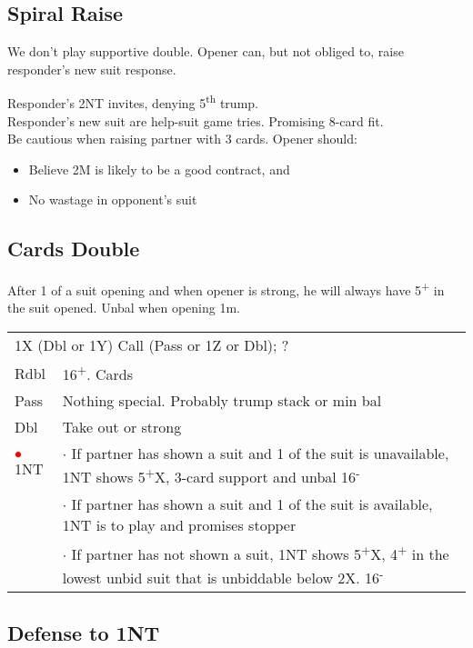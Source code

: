 \documentclass{article}
\newcommand{\nt}{\relsize{-1}NT\relsize{1}}
\newcommand{\up}{\textsuperscript{+}}
\newcommand{\down}{\textsuperscript{-}}
\newcommand{\al}{\textcolor{red}{$\bullet$}}
\begin{document}
\subsection{Spiral Raise}
We don't play supportive double. Opener can, but not obliged to, raise responder's new suit response.

Responder's 2\nt{} invites, denying 5\textsuperscript{th} trump. \\
Responder's new suit are help-suit game tries. Promising 8-card fit. \\
Be cautious when raising partner with 3 cards. Opener should:
\begin{itemize}
	\itemsep0em
	\item Believe 2M is likely to be a good contract, and
	\item No wastage in opponent's suit
\end{itemize}

\subsection{Cards Double}
After 1 of a suit opening and when opener is strong, he will always have 5\up{} in the suit opened. Unbal when opening 1m. \\

\begin{tabular}{|l|p{6.5cm}}
	\multicolumn{2}{l}{1X (Dbl or 1Y) Call (Pass or 1Z or Dbl); ?} \\
	Rdbl & 16\up{}. Cards \\
	Pass & Nothing special. Probably trump stack or min bal \\
	Dbl & Take out or strong \\
	\al{}1\nt{} &  $\cdot$ If partner has shown a suit and 1 of the suit is unavailable, 1\nt{} shows 5\up{}X, 3-card support and unbal 16\down{} \\
	 &  $\cdot$ If partner has shown a suit and 1 of the suit is available, 1\nt{} is to play and promises stopper \\
	 &  $\cdot$ If partner has not shown a suit, 1\nt{} shows 5\up{}X, 4\up{} in the lowest unbid suit that is unbiddable below 2X. 16\down{} \\
\end{tabular}

\subsection{Defense to 1\nt{}}
\end{document}
